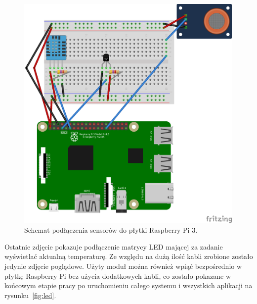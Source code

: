 \documentclass[12pt]{report}
\begin{document}
{\begin{figure}[h]
	\centering
	\includegraphics[width=0.99\textwidth]{images/rpi-master.png}
	\caption{Schemat podłączenia sensorów do płytki Raspberry Pi 3.}
\end{figure}
\FloatBarrier	

Ostatnie zdjęcie pokazuje podłączenie matrycy LED mającej za zadanie wyświetlać aktualną temperaturę. Ze względu na dużą ilość kabli zrobione zostało jedynie zdjęcie poglądowe. Użyty moduł można również wpiąć bezpośrednio w płytkę Raspberry Pi bez użycia dodatkowych kabli, co zostało pokazane w końcowym etapie pracy po uruchomieniu całego systemu i wszystkich aplikacji na rysunku~\ref{fig:led}. 

}
\end{document}
